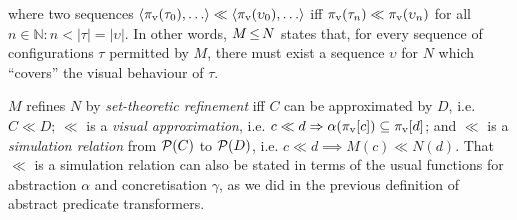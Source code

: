 \noindent where two sequences $\langle \pi_{\textrm{v}}(\tau_{0}), \ldots \rangle \ll \langle \pi_{\textrm{v}}(\upsilon_{0}), \ldots \rangle$ iff $\pi_{\textrm{v}}(\tau_{n}) \ll \pi_{\textrm{v}}(\upsilon_{n})$ for all $n \in \mathbb{N} : n < | \tau | = | \upsilon |$. In other words, $M \operatorname{\leq} N$ states that, for every sequence of configurations $\tau$ permitted by $M$, there must exist a sequence $\upsilon$ for $N$ which ``covers'' the visual behaviour of $\tau$.



 $M$ refines $N$ by \textit{set-theoretic refinement} iff $C$ can be approximated by $D$, i.e. $C \ll D$; $\ll$ is a \textit{visual approximation}, i.e. $c \ll d \Rightarrow \alpha(\pi_{\textrm{v}}[c]) \subseteq \pi_{\textrm{v}}[d]$; and $\ll$ is a \textit{simulation relation} from $\mathcal{P}(C)$ to $\mathcal{P}(D)$, i.e. $c \ll d \implies M(c) \ll N(d)$. That $\ll$ is a simulation relation can also be stated in terms of the usual functions for abstraction $\alpha$ and concretisation $\gamma$, as we did in the previous definition of abstract predicate transformers.

